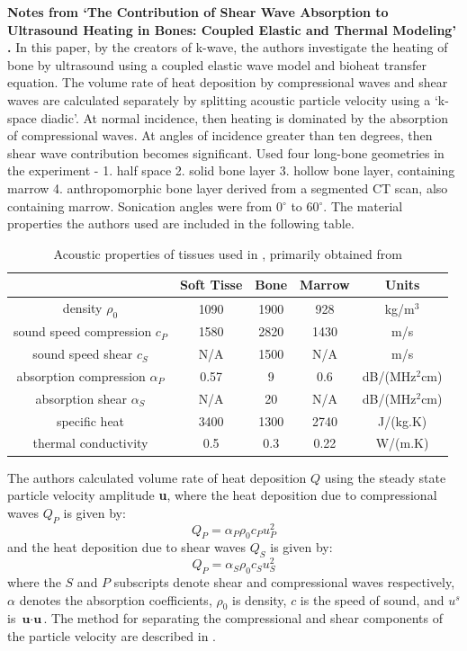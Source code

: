 \documentclass[11pt,titlepage]{article} %
\begin{document}
\textbf{Notes from `The Contribution of Shear Wave Absorption to Ultrasound Heating in Bones: Coupled Elastic and Thermal Modeling' \cite{treeby2015contribution}.}
In this paper, by the creators of k-wave, the authors investigate the heating of bone by ultrasound using a coupled elastic wave model and bioheat transfer equation. The volume rate of heat deposition by compressional waves and shear waves are calculated separately by splitting acoustic particle velocity using a `k-space diadic'. At normal incidence, then heating is dominated by the absorption of compressional waves. At angles of incidence greater than ten degrees, then shear wave contribution becomes significant.
Used four long-bone geometries in the experiment - 1. half space 2. solid bone layer 3. hollow bone layer, containing marrow 4. anthropomorphic bone layer derived from a segmented CT scan, also containing marrow. Sonication angles were from 0$^{\circ}$ to 60$^{\circ}$. The material properties the authors used are included in the following table. 
 \begin{table}[!h]
\begin{center}
  \begin{tabular}{| c | c | c | c | c | }
    \hline
     & Soft Tisse & Bone & Marrow & Units \\ \hline
     density $\rho_0$ & 1090 & 1900 & 928 & kg/m$^3$ \\ 
     sound speed compression $c_P$ & 1580 & 2820 & 1430 & m/s \\ 
     sound speed shear $c_S$ & N/A & 1500 & N/A & m/s \\ 
     absorption compression $\alpha_P$ & 0.57 & 9 & 0.6 & dB/(MHz$^2$cm) \\
     absorption shear $\alpha_S$ & N/A & 20 & N/A & dB/(MHz$^2$cm) \\
	 specific heat & 3400 & 1300 & 2740 & J/(kg.K)\\
	 thermal conductivity & 0.5 & 0.3 & 0.22 & W/(m.K)\\
    \hline
  \end{tabular}
\end{center}
\caption{Acoustic properties of tissues used in \cite{treeby2015contribution}, primarily obtained from  \cite{duck1990physical}}
\end{table}
\linespread{1.0}
The authors calculated volume rate of heat deposition $Q$ using the steady state particle velocity amplitude \textbf{u}, where the heat deposition due to compressional waves $Q_P$ is given by:
\begin{equation}
Q_P = \alpha_P \rho_0 c_P u_P^2
\end{equation}
and the heat deposition due to shear waves $Q_S$ is given by:
\begin{equation}
Q_P = \alpha_S \rho_0 c_S u_S^2
\end{equation}
where the $S$ and $P$ subscripts denote shear and compressional waves respectively, $\alpha$ denotes the absorption coefficients, $\rho_0$ is density, $c$ is the speed of sound, and $u^s$ is $\textbf{u} \cdot \textbf{u}$. The method for separating the compressional and shear components of the particle velocity are described in \cite{treeby2014modeling}.
\end{document}
